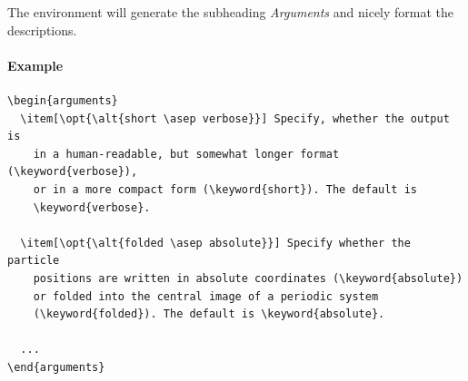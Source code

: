 \documentclass[
a4paper,                        %
11pt,                           %
twoside,                        %
footsepline,                    %
headsepline,                    %
headexclude,                    %
footexclude,                    %
pagesize,                       %
bibtotocnumbered,               %
idxtotoc                        %
]{scrartcl}
\begin{document}
The environment will generate the subheading \emph{Arguments} and
nicely format the descriptions.

\paragraph{Example}
\begin{verbatim}
\begin{arguments}
  \item[\opt{\alt{short \asep verbose}}] Specify, whether the output is
    in a human-readable, but somewhat longer format (\keyword{verbose}),
    or in a more compact form (\keyword{short}). The default is
    \keyword{verbose}.
  
  \item[\opt{\alt{folded \asep absolute}}] Specify whether the particle
    positions are written in absolute coordinates (\keyword{absolute})
    or folded into the central image of a periodic system
    (\keyword{folded}). The default is \keyword{absolute}.
  
  ...
\end{arguments}
\end{verbatim}
\end{document}
